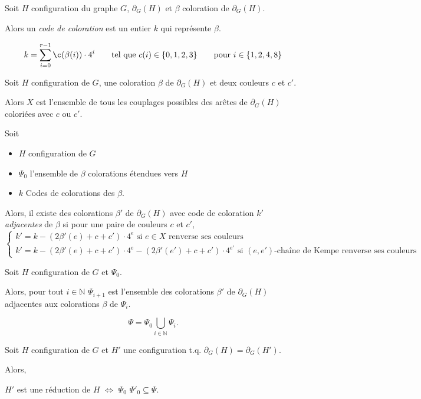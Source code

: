 \documentclass{beamer}
\begin{document}
\begin{frame}
Soit $H$ configuration du graphe $G$, $\partial_G(H)$  et $\beta$ coloration de $\partial_G(H)$. 

Alors un \emph{code de coloration} est un entier $k$ qui représente $\beta$.

$$
k = \sum_{i=0}^{r-1} \c(\beta(i)) \cdot 4^{i} \qquad \textrm{tel que   } c(i) \in \{ 0,1,2,3 \} \qquad \textrm{pour  } i \in \{1,2,4,8 \}
$$
\end{frame}

\begin{frame}
Soit $H$ configuration de $G$, une coloration $\beta$ de $\partial_G(H)$ et deux couleurs $c$ et $c'$. 

Alors $X$ est l'ensemble de tous les couplages possibles des arêtes de $\partial_G(H)$ coloriées avec $c$ ou $c'$. 

\pause

Soit 
\begin{itemize}
\item $H$ configuration de $G$\\
\item $\Psi_0$ l'ensemble de $\beta$ colorations étendues vers $H$ \\
\item $k$ Codes de colorations des $\beta$. 
\end{itemize}
Alors, il existe des colorations $\beta'$ de $\partial_G(H)$ avec code de coloration $k'$ \emph{adjacentes} de $\beta$ si pour une paire de couleurs $c$ et $c'$,
$$
\begin{cases}
k' =  k - (2\beta'(e)+c + c')\cdot 4^{e} \textrm{ si $e \in X$ renverse ses couleurs}\\
k' = k  - (2\beta'(e)+c + c')\cdot 4^{e} - (2\beta'(e')+c + c')\cdot 4^{e'} \textrm{ si $(e,e')$-chaîne de Kempe renverse ses couleurs}
\end{cases}
$$
\end{frame}

\begin{frame}
Soit $H$ configuration de $G$ et $\Psi_0$.

 Alors, pour tout $i \in \mathbb{N}$ $\Psi_{i+1}$ est l'ensemble des colorations $\beta'$ de $\partial_G(H)$ adjacentes aux colorations $\beta$ de $\Psi_i$.
 
\pause

$$
\Psi = \Psi_0 \bigcup_{i\in \mathbb{N}}\Psi_i.
$$
\end{frame}

\begin{frame}
\begin{theorem}
Soit $H$ configuration de $G$ et $H'$ une configuration t.q. $\partial_G(H)=\partial_G(H')$. 

Alors,
\begin{center}
$H'$ est une réduction de  $H$ $\Leftrightarrow$ $\Psi_0$  $\Psi'_0 \subseteq \Psi$.
\end{center}
\end{theorem}
\end{frame}
\end{document}
